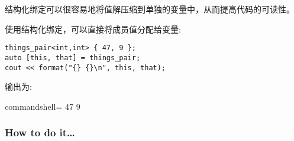 
结构化绑定可以很容易地将值解压缩到单独的变量中，从而提高代码的可读性。

使用结构化绑定，可以直接将成员值分配给变量:

\begin{lstlisting}[style=styleCXX]
things_pair<int,int> { 47, 9 };
auto [this, that] = things_pair;
cout << format("{} {}\n", this, that);
\end{lstlisting}

输出为:

\begin{tcblisting}{commandshell={}}
47 9
\end{tcblisting}

\subsubsection{How to do it…}

